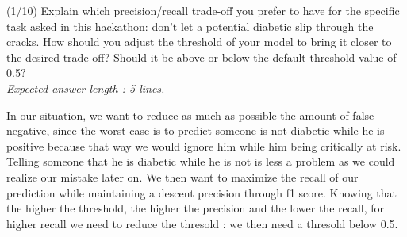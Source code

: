 \documentclass [a4paper, 11pt] {article}
\begin{document}
\begin{question}{2.2}
(1/10) Explain which precision/recall trade-off you prefer to have for the specific task asked in this hackathon: don't let a potential diabetic slip through the cracks. How should you adjust the threshold of your model to bring it closer to the desired trade-off? Should it be above or below the default threshold value of 0.5?\\
\textit{Expected answer length : 5 lines.}
\end{question}
\begin{answer}\color{blue}
In our situation, we want to reduce as much as possible the amount of false negative, since the worst case is to predict someone is not diabetic while he is positive because that way we would ignore him while him being critically at risk. Telling someone that he is diabetic while he is not is less a problem as we could realize our mistake later on. We then want to maximize the recall of our prediction while maintaining a descent precision through f1 score. 
Knowing that the higher the threshold, the higher the precision and the lower the recall, for higher recall we need to reduce the thresold : we then need a thresold below 0.5. 
\end{answer}
\end{document}
